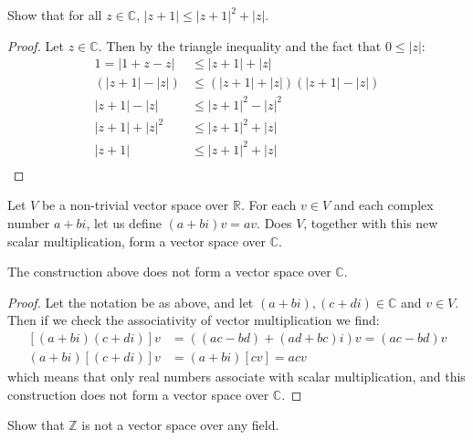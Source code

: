 \documentclass{article}
\begin{document}
\setcounter{problem}{17}
\begin{problem}
Show that for all $z \in \mathbb{C}$, $|z+1| \le |z+1|^{2} + |z|$.
\end{problem}

\begin{solution}
\begin{proof}
Let $z \in \mathbb{C}$. Then by the triangle inequality and the fact that $0\le |z|$:
\begin{align*}
1 = |1 + z - z| &\le |z+1| + |z| \\
\left( |z+1| - |z| \right) &\le \left( |z+1| + |z| \right) \left( |z+1| - |z| \right) \\
|z+1| - |z| &\le |z+1|^{2} - |z|^{2} \\
|z+1| + |z|^{2} &\le |z+1|^{2} + |z| \\
|z+1| &\le |z+1|^{2} + |z| \\
\end{align*}
\end{proof}
\end{solution}

\setcounter{problem}{60}
\begin{problem}
Let $V$ be a non-trivial vector space over $\mathbb{R}$. For each $v \in V$ and each complex number $a + bi$, let us define $(a+bi)v = av$. Does $V$, together with this new scalar multiplication, form a vector space over $\mathbb{C}$.
\end{problem}

\begin{solution}
The construction above does not form a vector space over $\mathbb{C}$.
\begin{proof}
Let the notation be as above, and let $(a+bi),(c+di) \in \mathbb{C}$ and $v \in V$. Then if we check the associativity of vector multiplication we find:
\begin{align*}
\left[(a+bi)(c+di)\right]v &= \left( (ac-bd) + (ad+bc)i \right)v = (ac-bd)v\\
(a+bi)\left[(c+di)\right]v &= (a+bi)[cv] = acv
\end{align*}
which means that only real numbers associate with scalar multiplication, and this construction does not form a vector space over $\mathbb{C}$.
\end{proof}
\end{solution}

\setcounter{problem}{69}
\begin{problem}
Show that $\mathbb{Z}$ is not a vector space over any field.
\end{problem}
\end{document}
